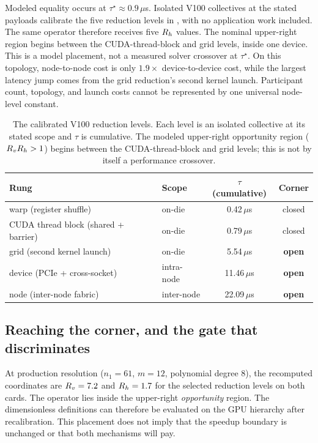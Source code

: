 Modeled equality occurs at $\tau^{\star}\approx0.9\,\mu$s. Isolated V100 collectives at the stated payloads calibrate the five reduction levels in , with no application work included. The same operator therefore receives five $R_h$ values. The nominal upper-right region begins between the CUDA-thread-block and grid levels, inside one device. This is a model placement, not a measured solver crossover at $\tau^{\star}$. On this topology, node-to-node cost is only $1.9\times$ device-to-device cost, while the largest latency jump comes from the grid reduction's second kernel launch. Participant count, topology, and launch costs cannot be represented by one universal node-level constant.

\begin{table}[htbp!]
\centering
\caption{The calibrated V100 reduction levels. Each level is an isolated collective at its stated scope and $\tau$ is cumulative. The modeled upper-right opportunity region ($R_vR_h>1$) begins between the CUDA-thread-block and grid levels; this is not by itself a performance crossover.}
\label{tab:ladder}
\begin{tabular}{@{}llcc@{}}
\toprule
\textbf{Rung} & \textbf{Scope} & $\tau$ \textbf{(cumulative)} & \textbf{Corner} \\
\midrule
warp (register shuffle)      & on-die     & 0.42\,$\mu$s  & closed \\
CUDA thread block (shared + barrier) & on-die & 0.79\,$\mu$s & closed \\
grid (second kernel launch)  & on-die     & 5.54\,$\mu$s  & \textbf{open} \\
device (PCIe + cross-socket) & intra-node & 11.46\,$\mu$s & \textbf{open} \\
node (inter-node fabric)     & inter-node & 22.09\,$\mu$s & \textbf{open} \\
\bottomrule
\end{tabular}
\end{table}

\subsection{Reaching the corner, and the gate that discriminates}\label{sec:gpu-corner}

At production resolution ($n_1=61$, $m=12$, polynomial degree 8), the recomputed coordinates are $R_v=7.2$ and $R_h=1.7$ for the selected reduction levels on both cards. The operator lies inside the upper-right \emph{opportunity} region. The dimensionless definitions can therefore be evaluated on the GPU hierarchy after recalibration. This placement does not imply that the speedup boundary is unchanged or that both mechanisms will pay.

